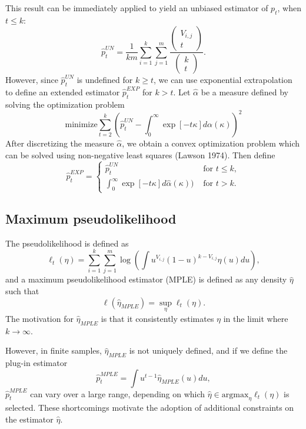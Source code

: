 \documentclass{article}
\newcommand{\argmax}{\text{argmax}}
\begin{document}
This result can be immediately applied to yield an unbiased estimator of $p_t$, when $t \leq k$:
\begin{equation}\label{eq:ustat}
\hat{p}_t^{UN} =  \frac{1}{km}\sum_{i=1}^k\sum_{j=1}^{m} \frac{\begin{pmatrix}
V_{i, j} \\ t
\end{pmatrix}}{\begin{pmatrix}
k \\ t
\end{pmatrix}}.
\end{equation}
However, since $\hat{p}_t^{UN}$ is undefined for $k \geq t$, we can use exponential extrapolation
to define an extended estimator $\hat{p}_t^{EXP}$ for $k > t$.
Let $\hat{\alpha}$ be a measure defined by solving the optimization problem
\[
\text{minimize} \sum_{t=2}^{k} (\hat{p}_t^{UN} - \int_0^\infty \exp[-t\kappa] d\alpha(\kappa))^2
\]
After discretizing the measure $\hat{\alpha}$, we obtain a convex optimization problem
which can be solved using non-negative least squares (Lawson 1974).
Then define
\[
\hat{p}_t^{EXP} = \begin{cases}
\hat{p}_t^{UN}&\text{ for }t \leq k,\\
\int_0^\infty \exp[-t\kappa] d\hat{\alpha}(\kappa))&\text{ for }t > k.
\end{cases}
\]

\subsection{Maximum pseudolikelihood}

The pseudolikelihood is defined as
\begin{equation}\label{eq:psuedo}
\ell_t(\eta) = \sum_{i=1}^k \sum_{j=1}^{m} \log\left(\int u^{V_{i, j}} (1-u)^{k - V_{i, j}} \eta(u) du\right),
\end{equation}
and a maximum pseudolikelihood estimator (MPLE) is defined as any
density $\hat{\eta}$ such that
\[
\ell(\hat{\eta}_{MPLE}) = \sup_{\eta} \ell_t(\eta).
\]
The motivation for $\hat{\eta}_{MPLE}$ is that it consistently
estimates $\eta$ in the limit where $k \to \infty$.

However, in finite samples, $\hat{\eta}_{MPLE}$ is not uniquely defined,
and if we define the plug-in estimator
\[
\hat{p}_t^{MPLE} = \int u^{t-1} \hat{\eta}_{MPLE}(u) du,
\]
$\hat{p}_t^{MPLE}$ can vary over a large range, depending on which $\hat{\eta} \in \argmax_{\eta} \ell_t(\eta)$
is selected.
These shortcomings motivate the adoption of additional constraints on the estimator $\hat{\eta}.$
\end{document}
